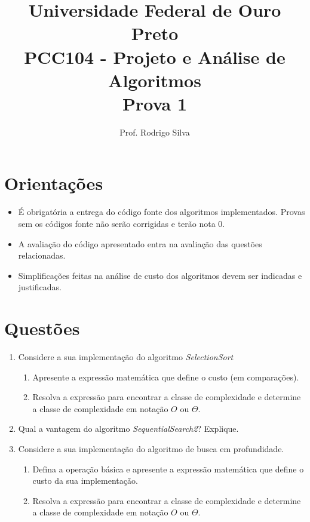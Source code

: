 \documentclass{article}
\title{\vspace{-2 cm}Universidade Federal de Ouro Preto \\ PCC104 - Projeto e Análise de Algoritmos \\ Prova 1}
\author{Prof. Rodrigo Silva}
\begin{document}
\maketitle

\section*{Orientações}

\begin{itemize}
    \item É obrigatória a entrega do código fonte dos algoritmos implementados. Provas sem os códigos fonte não serão corrigidas e terão nota 0.
    \item A avaliação do código apresentado entra na avaliação das questões relacionadas. 
    \item Simplificações feitas na análise de custo dos algoritmos devem ser indicadas e justificadas.
\end{itemize}

\section*{Questões}

\begin{enumerate}
    \item Considere a sua implementação do algoritmo \textit{SelectionSort}

    \begin{enumerate}
        \item Apresente a expressão matemática que define o custo (em comparações).
        \item Resolva a expressão para encontrar a classe de complexidade e determine a classe de complexidade em notação $O$ ou $\Theta$. 
    \end{enumerate}

    \item Qual a vantagem do algoritmo \textit{SequentialSearch2}? Explique.
    
    \item Considere a sua implementação do algoritmo de busca em profundidade.
    \begin{enumerate}
        \item Defina a operação básica e apresente a expressão matemática que define o custo da sua implementação.
        \item Resolva a expressão para encontrar a classe de complexidade e determine a classe de complexidade em notação $O$ ou $\Theta$.
    \end{enumerate}

\end{enumerate}


%
%
\end{document}
